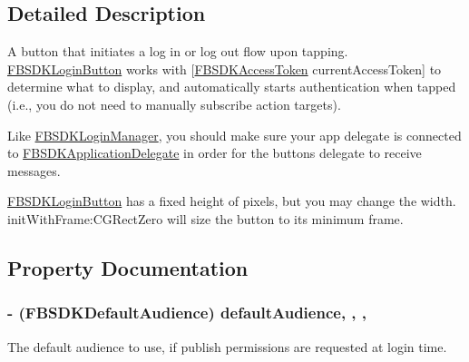 \subsection{Detailed Description}
A button that initiates a log in or log out flow upon tapping.  {\ttfamily \hyperlink{interface_f_b_s_d_k_login_button}{F\+B\+S\+D\+K\+Login\+Button}} works with {\ttfamily \mbox{[}\hyperlink{interface_f_b_s_d_k_access_token}{F\+B\+S\+D\+K\+Access\+Token} current\+Access\+Token\mbox{]}} to determine what to display, and automatically starts authentication when tapped (i.\+e., you do not need to manually subscribe action targets).

Like {\ttfamily \hyperlink{interface_f_b_s_d_k_login_manager}{F\+B\+S\+D\+K\+Login\+Manager}}, you should make sure your app delegate is connected to {\ttfamily \hyperlink{interface_f_b_s_d_k_application_delegate}{F\+B\+S\+D\+K\+Application\+Delegate}} in order for the button\textquotesingle{}s delegate to receive messages.

{\ttfamily \hyperlink{interface_f_b_s_d_k_login_button}{F\+B\+S\+D\+K\+Login\+Button}} has a fixed height of {} pixels, but you may change the width. {\ttfamily init\+With\+Frame\+:C\+G\+Rect\+Zero} will size the button to its minimum frame. 

\subsection{Property Documentation}
\hypertarget{interface_f_b_s_d_k_login_button_a27d7d78187d38c367957bac4b28c7ab6}{}
\subsubsection[{default\+Audience}]{\setlength{\rightskip}{0pt plus 5cm}-\/ (F\+B\+S\+D\+K\+Default\+Audience) default\+Audience\hspace{0.3cm}{\ttfamily [read]}, {\ttfamily [write]}, {\ttfamily [nonatomic]}, {\ttfamily [assign]}}\label{interface_f_b_s_d_k_login_button_a27d7d78187d38c367957bac4b28c7ab6}
The default audience to use, if publish permissions are requested at login time. \hypertarget{interface_f_b_s_d_k_login_button_a9334392431c0fb78a08fe4038a2a30fb}{}
